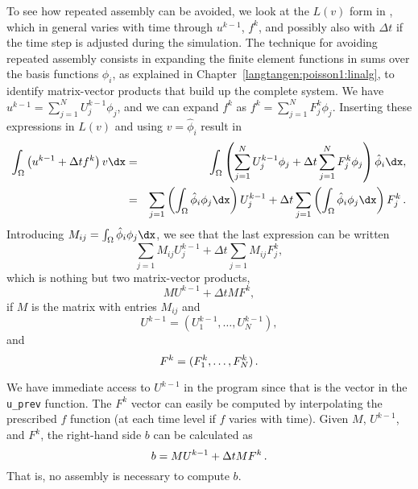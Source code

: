 To see how repeated assembly can be avoided, we look at the $L(v)$
form in , which in general varies with
time through $u^{k-1}$, $f^k$, and possibly also with $\Delta t$
if the time step is adjusted during the simulation.
The technique for avoiding repeated assembly consists in
expanding the finite element functions in sums over the basis functions
$\phi_i$, as explained
in Chapter~\ref{langtangen:poisson1:linalg}, to identify matrix-vector
products that build up the complete system. We have
$u^{k-1}=\sum_{j=1}^NU^{k-1}_j\phi_j$, and we can expand $f^k$ as
$f^{k}=\sum_{j=1}^NF^{k}_j\phi_j$. Inserting these expressions in $L(v)$
and using
$v=\hat\phi_i$ result in
\begin{eqnarray*}
\int_\Omega \left(u^{k-1} + \Delta tf^k\right)v\dx &=&
\int_\Omega \left(\sum_{j=1}^NU^{k-1}_j\phi_j + \Delta t\sum_{j=1}^NF^{k}_j\phi_j\right)\hat\phi_i\dx,\\
&=&\sum_{j=1}\left(\int_\Omega \hat\phi_i\phi_j\dx\right)U^{k-1}_j
 + \Delta t\sum_{j=1}\left(\int_\Omega \hat\phi_i\phi_j\dx\right)F^{k}_j\langtangenep
\end{eqnarray*}
Introducing $M_{ij} = \int_\Omega \hat\phi_i\phi_j\dx$, we see that
the last expression can be written
\[ \sum_{j=1}M_{ij}U^{k-1}_j + \Delta t \sum_{j=1}M_{ij}F^{k}_j,\]
which is nothing but two matrix-vector products,
\[ MU^{k-1} + \Delta t MF^k,\]
if $M$ is the matrix with entries $M_{ij}$ and
\[U^{k-1}=(U^{k-1}_1,\ldots,U^{k-1}_N),\] 
and 
\[ F^k=(F^{k}_1,\ldots,F^{k}_N)\thinspace .\]

We have immediate access to $U^{k-1}$ 
in the program since that is the vector
in the {\fontsize{12pt}{12pt}\verb!u_prev!} function. The $F^k$ vector can easily be
computed by interpolating the prescribed $f$ function (at each time level if
$f$ varies with time). Given $M$, $U^{k-1}$, and $F^k$, the right-hand side
$b$ can be calculated as
\[ b = MU^{k-1} + \Delta t MF^k \thinspace .\]
That is, no assembly is necessary to compute $b$.

